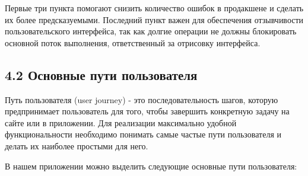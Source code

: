 \noindent Первые три пункта помогают снизить количество ошибок в продакшене и сделать их более предсказуемыми. Последний пункт важен для обеспечения отзывчивости пользовательского интерфейса, так как долгие операции не должны блокировать основной поток выполнения, ответственный за отрисовку интерфейса.

\subsection*{4.2 Основные пути пользователя}

Путь пользователя (user journey) - это последовательность шагов, которую предпринимает пользователь для того, чтобы завершить конкретную задачу на сайте или в приложении. Для реализации максимально удобной функциональности необходимо понимать самые частые пути пользователя и делать их наиболее простыми для него.

В нашем приложении можно выделить следующие основные пути пользователя:

